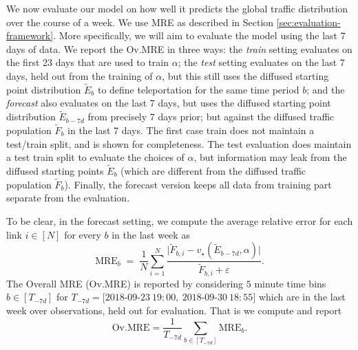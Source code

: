 \documentclass[sigconf, review]{acmart}
\begin{document}
We now evaluate our model on how well it predicts the global traffic distribution over the course of a week.  
We use MRE as described in Section \ref{sec:evaluation-framework}.    More specifically, we will aim to evaluate the model using the last 7 days of data.  We report the Ov.MRE in three ways:  
the \emph{train} setting evaluates on the first 23 days that are used to train $\alpha$;
the \emph{test} setting evaluates on the last 7 days, held out from the training of $\alpha$, but this still uses the diffused starting point distribution $\tilde E_b$ to define teleportation for the same time period $b$; and 
the \emph{forecast} also evaluates on the last 7 days, but uses the diffused starting point distribution $\tilde E_{b-7d}$ from precisely 7 days prior; but against the diffused traffic population $\tilde F_b$ in the last 7 days.  
The first case train does not maintain a test/train split, and is shown for completeness.   The test evaluation does maintain a test train split to evaluate the choices of $\alpha$, but information may leak from the diffused starting points $\tilde E_b$ (which are different from the diffused traffic population $\tilde F_b$). Finally, the forecast version keeps all data from training part separate from the evaluation.  

To be clear, in the forecast setting, 
we compute the average relative error for each link $i \in [N]$ for every $b$ in the last week as 
        \[
          \mathrm{MRE}_b
          \;=\;
          \frac{1}{N} \sum_{i=1}^{N}
          \frac{\bigl|\tilde F_{b,i} - v_\star(\tilde E_{b-7d},\alpha)\bigr|}
               {\tilde F_{b,i} + \varepsilon}.
        \]
The Overall MRE (Ov.MRE) is reported by considering $5$ minute time bins $b \in [T_{-7d}]$ for $T_{-7d} = [2018$-$09$-$23\ 19{:}00,\ 2018$-$09$-$30\ 18{:}55]$ which are in the last week over observations, held out for evaluation.  That is we compute and report
\[
\mathrm{Ov.MRE}
 = 
 \frac{1}{T_{-7d}} \sum_{b \in [T_{-7d}]} \mathrm{MRE}_b.
\]






\end{document}
